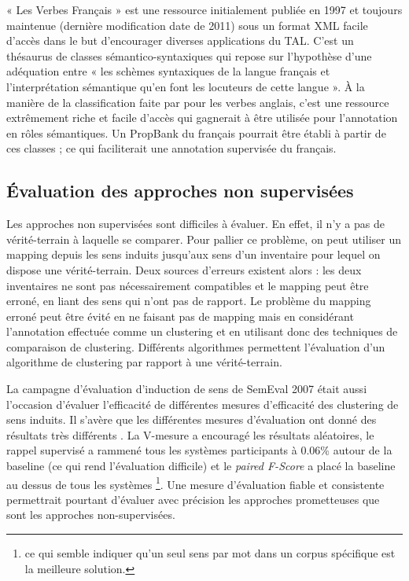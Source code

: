 « Les Verbes Français » est une ressource initialement publiée en 1997 et toujours maintenue (dernière modification date de 2011) sous un format XML facile d'accès dans le but d'encourager diverses applications du TAL. C'est un thésaurus de classes sémantico-syntaxiques qui repose sur l'hypothèse d'une adéquation entre « les schèmes syntaxiques de la langue français et l'interprétation sémantique qu'en font les locuteurs de cette langue ». À la manière de la classification faite par \cite{levin1993english} pour les verbes anglais, c'est une ressource extrêmement riche et facile d'accès qui gagnerait à être utilisée pour l'annotation en rôles sémantiques. Un PropBank du français pourrait être établi à partir de ces classes ; ce qui faciliterait une annotation supervisée du français.

\subsection{Évaluation des approches non supervisées}
\label{evalunsupervised}

Les approches non supervisées sont difficiles à évaluer. En effet, il n'y a pas de vérité-terrain à laquelle se comparer. Pour pallier ce problème, on peut utiliser un mapping depuis les sens induits jusqu'aux sens d'un inventaire pour lequel on dispose une vérité-terrain. Deux sources d'erreurs existent alors : les deux inventaires ne sont pas nécessairement compatibles et le mapping peut être erroné, en liant des sens qui n'ont pas de rapport. Le problème du mapping erroné peut être évité en ne faisant pas de mapping mais en considérant l'annotation effectuée comme un clustering et en utilisant donc des techniques de comparaison de clustering. Différents algorithmes permettent l'évaluation d'un algorithme de clustering par rapport à une vérité-terrain.

La campagne d'évaluation d'induction de sens de SemEval 2007 \citep{manandhar2010semeval} était aussi l'occasion d'évaluer l'efficacité de différentes mesures d'efficacité des clustering de sens induits. Il s'avère que les différentes mesures d'évaluation ont donné des résultats très différents \citep{pedersen2010duluth}. La V-mesure a encouragé les résultats aléatoires, le rappel supervisé a rammené tous les systèmes participants à 0.06\% autour de la baseline (ce qui rend l'évaluation difficile) et le \textit{paired F-Score} a placé la baseline au dessus de tous les systèmes \footnote{ce qui semble indiquer qu'un seul sens par mot dans un corpus spécifique est la meilleure solution.}. Une mesure d'évaluation fiable et consistente permettrait pourtant d'évaluer avec précision les approches prometteuses que sont les approches non-supervisées.

